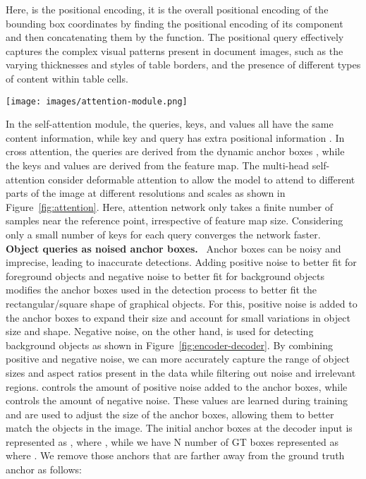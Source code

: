 \documentclass[sn-mathphys]{sn-jnl}\jyear{2021}\theoremstyle{thmstyleone}\newtheorem{theorem}{Theorem}\newtheorem{proposition}[theorem]{Proposition}\theoremstyle{thmstyletwo}\newtheorem{example}{Example}\newtheorem{remark}{Remark}\theoremstyle{thmstylethree}\newtheorem{definition}{Definition}\usepackage{amsmath}
\begin{document}
Here,  is the positional encoding, it is the overall positional encoding of the bounding box coordinates by finding the positional encoding of its component and then concatenating them by the  function. The positional query  effectively captures the complex visual patterns present in document images, such as the varying thicknesses and styles of table borders, and the presence of different types of content within table cells.\\
\begin{figure*}[h]
\centering
\texttt{[image: images/attention-module.png]}
\caption{Illustrating design of attention module. The attention network only takes a finite number of samples near the reference point, irrespective of feature map size. Here, Sampling is performed at multiple scales using a deformation field computed by a deformable convolutional neural network. For clear visualization, we show sampling points with attention weights as a circle where the circle color represents its attention weight: blue indicates low intensity while red indicates high intensity. The rectangle represents the predicted bounding box in the decoder. }\label{fig:attention}
\end{figure*} 
In the self-attention module, the queries, keys, and values all have the same content information, while key and query has extra positional information . In cross attention, the queries are derived from the dynamic anchor boxes , while the keys and values are derived from the feature map.
The multi-head self-attention consider deformable attention to allow the model to attend to different parts of the image at different resolutions and scales as shown in Figure~\ref{fig:attention}. Here, attention network only takes a finite number of samples near the reference point, irrespective of feature map size. Considering only a small number of keys for each query converges the network faster. \\
\noindent\textbf {Object queries as noised anchor boxes.}~
 Anchor boxes can be noisy and imprecise, leading to inaccurate detections. Adding positive noise to better fit for foreground objects and negative noise to better fit for background objects modifies the anchor boxes used in the detection process to better fit the rectangular/square shape of graphical objects. 
For this, positive noise is added to the anchor boxes to expand their size and account for small variations in object size and shape. Negative noise, on the other hand, is used for detecting background objects as shown in Figure~\ref{fig:encoder-decoder}. By combining positive and negative noise, we can more accurately capture the range of object sizes and aspect ratios present in the data while filtering out noise and irrelevant regions.  controls the amount of positive noise added to the anchor boxes, while  controls the amount of negative noise. These values are learned during training and are used to adjust the size of the anchor boxes, allowing them to better match the objects in the image. The initial anchor boxes at the decoder input is represented as , where , while we have N number of GT boxes represented as  where . We remove those anchors that are farther away from the ground truth anchor as follows: 
\end{document}
